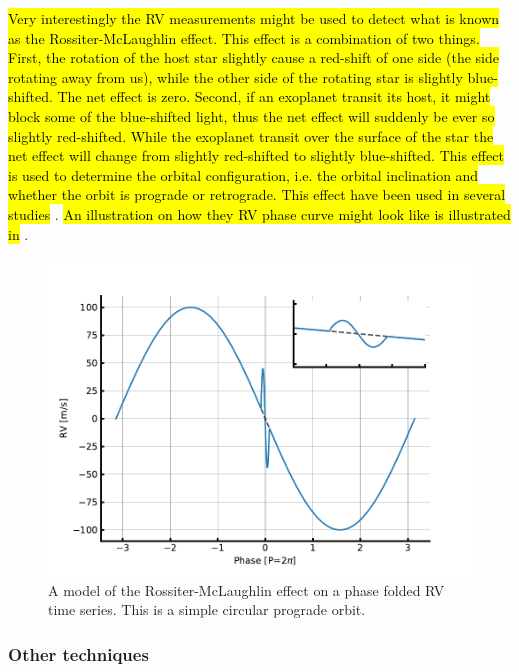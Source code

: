 \hl{Very interestingly the RV measurements might be used to detect what is known as the
Rossiter-McLaughlin effect. This effect is a combination of two things. First, the rotation of the
host star slightly cause a red-shift of one side (the side rotating away from us), while the other
side of the rotating star is slightly blue-shifted. The net effect is zero. Second, if an exoplanet
transit its host, it might block some of the blue-shifted light, thus the net effect will suddenly
be ever so slightly red-shifted. While the exoplanet transit over the surface of the star the net
effect will change from slightly red-shifted to slightly blue-shifted. This effect is used to
determine the orbital configuration, i.e. the orbital inclination and whether the orbit is prograde
or retrograde. This effect have been used in several studies} \citep[][to mention just a
few]{Winn2005,Triaud2010}. \hl{An illustration on how they RV phase curve might look like is
illustrated in} .

\begin{figure}[htpb!]
    \centering
    \includegraphics[width=1.0\linewidth]{figures/RMeffect.pdf}
    \caption{A model of the Rossiter-McLaughlin effect on a phase folded RV time series. This is a
             simple circular prograde orbit.}
    \label{fig:RMeffect}
\end{figure}

\subsubsection{Other techniques}

